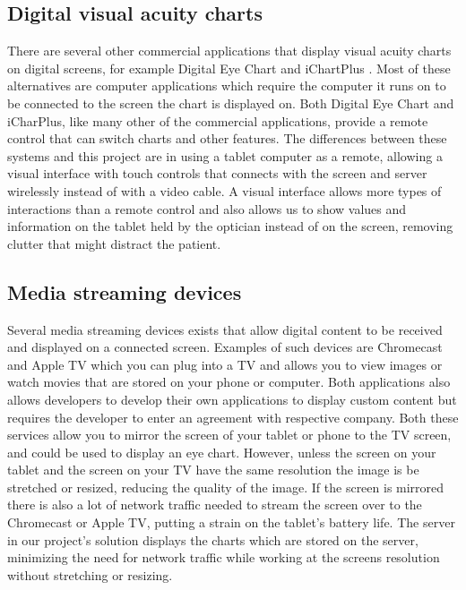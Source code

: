 \documentclass[12pt,a4paper,notitlepage]{report}
\begin{document}
\subsection{Digital visual acuity charts}%
There are several other commercial applications that display visual acuity charts on digital screens, for example Digital Eye Chart \cite{digitaleyechart} and iChartPlus \cite{ichartplus}. Most of these alternatives are computer applications which require the computer it runs on to be connected to the screen the chart is displayed on. Both Digital Eye Chart and iCharPlus, like many other of the commercial applications, provide a remote control that can switch charts and other features. The differences between these systems and this project are in using a tablet computer as a remote, allowing a visual interface with touch controls that connects with the screen and server wirelessly instead of with a video cable. A visual interface allows more types of interactions than a remote control and also allows us to show values and information on the tablet held by the optician instead of on the screen, removing clutter that might distract the patient.

\subsection{Media streaming devices}
Several media streaming devices exists that allow digital content to be received and displayed on a connected screen. Examples of such devices are Chromecast \cite{chromecast} and Apple TV \cite{appletv} which you can plug into a TV and allows you to view images or watch movies that are stored on your phone or computer. Both applications also allows developers to develop their own applications to display custom content but requires the developer to enter an agreement with respective company. Both these services allow you to mirror the screen of your tablet or phone to the TV screen, and could be used to display an eye chart. However, unless the screen on your tablet and the screen on your TV have the same resolution the image is be stretched or resized, reducing the quality of the image. If the screen is mirrored there is also a lot of network traffic needed to stream the screen over to the Chromecast or Apple TV, putting a strain on the tablet's battery life. The server in our project's solution displays the charts which are stored  on the server, minimizing the need for network traffic while working at the screens resolution without stretching or resizing.
\end{document}
